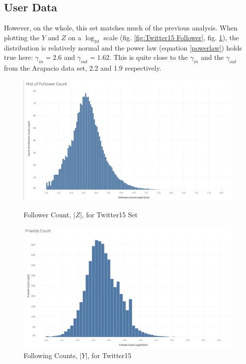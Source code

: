 \documentclass[NETN,manuscript]{stjour-new}
\begin{document}
\subsection{User Data}
However, on the whole, this set matches much of the previous analysis. When plotting the $Y$ and $Z$ on a $\log_{10}$ scale (fig. \ref{fig:Twitter15 Follower}, fig. \ref{fig:Twitter15 Following}), the distribution is relatively normal and the power law (equation \ref{powerlaw}) holds true here:  $\gamma_{in} = 2.6$ and $\gamma_{out} = 1.62$. This is quite close to the $\gamma_{in}$ and the $\gamma_{out}$  from the Arapacio data set, 2.2 and 1.9 respectively.
 
 \begin{figure}[h]
  \includegraphics[width=\linewidth]{Twitter15 Follower Count.png}
  \caption{Follower Count, $|Z|$, for Twitter15 Set}\label{fig:Twitter15 Follower}
\endminipage\hfill
{}
  \includegraphics[width=\linewidth]{Twitter15 FriendsCount.png}
  \caption{Following Counts, $|Y|$, for Twitter15}\label{fig:Twitter15 Following}
\endminipage\hfill
\end{figure}
\end{document}

